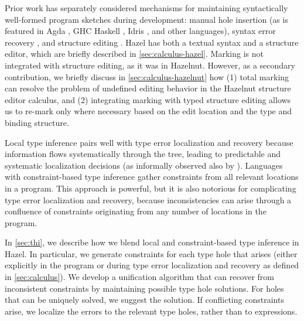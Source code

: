 Prior work has separately considered mechanisms for maintaining syntactically well-formed program sketches during development: manual hole insertion (as is featured in Agda \cite{norell:thesis}, GHC Haskell \cite{haskell-holes}, Idris \cite{DBLP:journals/jfp/Brady13}, and other languages), syntax error recovery \cite{medeiros20,sorkin11}, and structure editing \cite{HazelnutPOPL}. 
Hazel has both a textual syntax and a structure editor, which are briefly described in \cref{sec:calculus-hazel}.
Marking is not integrated with structure editing, as it was in Hazelnut. 
However, as a secondary contribution, 
we briefly discuss in \cref{sec:calculus-hazelnut} how (1)  total marking can resolve the problem of undefined editing behavior in the Hazelnut structure editor calculus, 
and (2) integrating marking with typed structure editing allows us to re-mark only where necessary based on the edit location and the type and binding structure.

Local type inference pairs well with type error localization and recovery because information flows systematically through the tree, leading to predictable and systematic localization decisions (as informally observed also by \cite{Localinf}). Languages with constraint-based type inference gather constraints from all relevant locations in a program. This approach is powerful, but it is also notorious for complicating type error localization and recovery, because inconsistencies can arise through a confluence of constraints originating from any number of locations in the program. 

In \cref{sec:thi}, we describe how we blend local and constraint-based type inference in Hazel. In particular,  
we generate constraints for each type hole that arises (either explicitly in the program or during type error localization and recovery as defined in \cref{sec:calculus}). 
We develop a unification algorithm that can recover from inconsistent constraints by maintaining possible type hole solutions. For holes that can be uniquely solved, we suggest the solution. 
If conflicting constraints arise, we localize the errors to the relevant type holes, rather 
than to expressions. 


